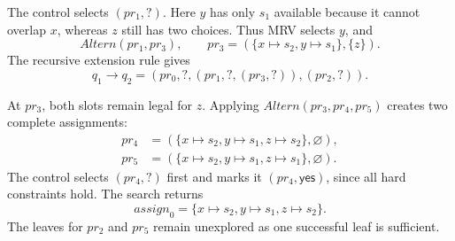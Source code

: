 The control selects $(pr_1,?)$. Here $y$ has only $s_1$
available because it cannot overlap $x$, whereas $z$
still has two choices. Thus MRV selects $y$, and
\[
\mathit{Altern}(pr_1,pr_3),
\qquad
pr_3=(\{x\mapsto s_2,y\mapsto s_1\},\{z\}).
\]
The recursive extension rule gives
\[
q_1\longrightarrow
q_2=(pr_0,?,(pr_1,?,(pr_3,?)),(pr_2,?)).
\]

At $pr_3$, both slots remain legal for $z$. Applying
$\mathit{Altern}(pr_3,pr_4,pr_5)$ creates two complete
assignments:
\[
\begin{aligned}
pr_4&=(\{x\mapsto s_2,y\mapsto s_1,z\mapsto s_2\},
       \varnothing),\\
pr_5&=(\{x\mapsto s_2,y\mapsto s_1,z\mapsto s_1\},
       \varnothing).
\end{aligned}
\]
The control selects $(pr_4,?)$ first and marks it
$(pr_4,\mathsf{yes})$, since all hard constraints hold.
The search returns
\[
\mathit{assign}_0
=\{x\mapsto s_2,y\mapsto s_1,z\mapsto s_2\}.
\]
The leaves for $pr_2$ and $pr_5$ remain unexplored as one successful leaf is sufficient.